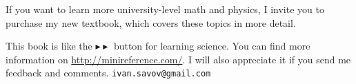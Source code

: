 \documentclass[letterpaper,9pt,journal]{IEEEtran}
\begin{document}
If you want to learn more university-level math and physics, 
I invite you to purchase my new textbook, which covers these topics in more detail.
        \begin{center}
            \setlength{\fboxsep}{0.45cm}
            \fbox{
            \begin{minipage}{55mm}   
\vspace{15mm}
\section*{\Large NO BULLSHIT \\ guide to \\ MATH and PHYSICS  } %
\vspace{17mm}
\ Contents:
\begin{itemize}
  \item {\sc high school math}%
  \item {\sc vectors}%
  \item {\sc mechanics}%
  \item {\sc differential calculus}%
  \item {\sc integral calculus}%
\end{itemize}
\vspace{8mm}

{\small \hfill  5\textonehalf[in] $\times$ 8\textonehalf[in] $\times$ 297[pages]}

\end{minipage}
            }
        \end{center}
This book is like the $\blacktriangleright\!\blacktriangleright$ button for learning science.        
You can find more information on \url{http://minireference.com/}.
I will also appreciate it if you send me feedback and comments. \hfill \texttt{ivan.savov@gmail.com}


%


    
\end{document}
